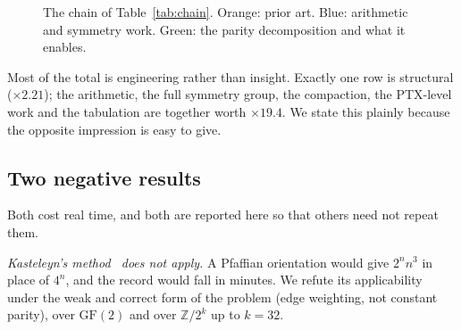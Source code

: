 \documentclass[11pt,a4paper]{article}
\begin{document}
\begin{figure}[t]
\centering
{}
\caption{The chain of Table~\ref{tab:chain}. Orange: prior art. Blue: arithmetic
and symmetry work. Green: the parity decomposition and what it enables.}
\label{fig:waterfall}
\end{figure}

Most of the total is engineering rather than insight. Exactly one row is
structural ($\times 2.21$); the arithmetic, the full symmetry group, the
compaction, the PTX-level work and the tabulation are together worth
$\times 19.4$. We state this plainly because the opposite impression is easy to
give.

\subsection{Two negative results}

Both cost real time, and both are reported here so that others need not repeat
them.

\emph{Kasteleyn's method~\cite{kasteleyn} does not apply.} A Pfaffian orientation
would give $2^n n^3$ in place of $4^n$, and the record would fall in minutes. We refute its
applicability under the weak and correct form of the problem (edge weighting,
not constant parity), over $\mathrm{GF}(2)$ and over $\mathbb{Z}/2^k$ up to
$k=32$.
\end{document}
